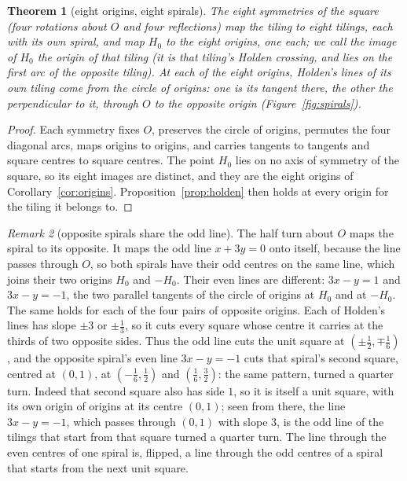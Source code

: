 \documentclass[11pt,a4paper]{article}
\theoremstyle{plain}
\newtheorem{theorem}{Theorem}
\theoremstyle{definition}
\theoremstyle{remark}
\newtheorem{remark}[theorem]{Remark}
\begin{document}
\begin{theorem}[eight origins, eight spirals]\label{thm:eight}
The eight symmetries of the square (four rotations about $O$ and four reflections) map the tiling to eight tilings, each with its own spiral, and map $H_0$ to the eight origins, one each; we call the image of $H_0$ the origin of that tiling (it is that tiling's Holden crossing, and lies on the first arc of the opposite tiling). At each of the eight origins, Holden's lines of its own tiling come from the circle of origins: one is its tangent there, the other the perpendicular to it, through $O$ to the opposite origin (Figure~\ref{fig:spirals}).
\end{theorem}

\begin{proof}
Each symmetry fixes $O$, preserves the circle of origins, permutes the four diagonal arcs, maps origins to origins, and carries tangents to tangents and square centres to square centres. The point $H_0$ lies on no axis of symmetry of the square, so its eight images are distinct, and they are the eight origins of Corollary~\ref{cor:origins}. Proposition~\ref{prop:holden} then holds at every origin for the tiling it belongs to.
\end{proof}



\begin{remark}[opposite spirals share the odd line]
The half turn about $O$ maps the spiral to its opposite. It maps the odd line $x+3y=0$ onto itself, because the line passes through $O$, so both spirals have their odd centres on the same line, which joins their two origins $H_0$ and $-H_0$. Their even lines are different: $3x-y=1$ and $3x-y=-1$, the two parallel tangents of the circle of origins at $H_0$ and at $-H_0$. The same holds for each of the four pairs of opposite origins. Each of Holden's lines has slope $\pm3$ or $\pm\tfrac13$, so it cuts every square whose centre it carries at the thirds of two opposite sides. Thus the odd line cuts the unit square at $(\pm\tfrac12,\mp\tfrac16)$, and the opposite spiral's even line $3x-y=-1$ cuts that spiral's second square, centred at $(0,1)$, at $(-\tfrac16,\tfrac12)$ and $(\tfrac16,\tfrac32)$: the same pattern, turned a quarter turn. Indeed that second square also has side $1$, so it is itself a unit square, with its own origin of origins at its centre $(0,1)$; seen from there, the line $3x-y=-1$, which passes through $(0,1)$ with slope $3$, is the odd line of the tilings that start from that square turned a quarter turn. The line through the even centres of one spiral is, flipped, a line through the odd centres of a spiral that starts from the next unit square.
\end{remark}
\end{document}
